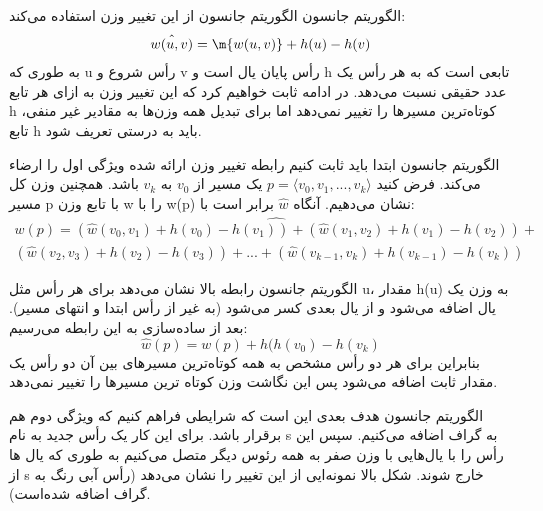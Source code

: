 \begin{itemframe}{الگوریتم جانسون}
\itm
الگوریتم جانسون از این تغییر وزن استفاده می‌کند:
\begin{align*}
\hat{w(u, v)} = \m{w(u, v)} + h(u) - h(v)
\end{align*}
\itm
به طوری که u رأس شروع و v رأس پایان یال است و h تابعی است که به هر رأس یک عدد حقیقی نسبت می‌دهد.
\itm
در ادامه ثابت خواهیم کرد که این تغییر وزن به ازای هر تابع h کوتاه‌ترین مسیرها را تغییر نمی‌دهد اما برای تبدیل همه وزن‌ها به مقادیر غیر منفی، تابع h باید به درستی تعریف شود.
\end{itemframe}

\begin{itemframe}{الگوریتم جانسون}
\itm
ابتدا باید ثابت ‌کنیم رابطه تغییر وزن ارائه شده ویژگی اول را ارضاء می‌کند.
\itm
فرض کنید
$ p= \langle v_0, v_1, ..., v_k \rangle$
یک مسیر از
$v_0$
به
$v_k$
باشد. همچنین وزن کل مسیر p با تابع وزن w را با  w(p) نشان می‌دهیم. آنگاه
$\hat{w}$
برابر است با:
\begin{align*}
\hat{w(p)= (\hat{w}(v_0, v_1) + h(v_0) -  h(v_1)) + (\hat{w}(v_1, v_2) + h(v_1) -  h(v_2)) + } \\
(\hat{w}(v_2, v_3) + h(v_2) -  h(v_3)) + ... + (\hat{w}(v_{k-1}, v_k) + h(v_{k-1}) -  h(v_k))
\end{align*}

\end{itemframe}

\begin{itemframe}{الگوریتم جانسون}
\itm
رابطه بالا نشان می‌دهد برای هر رأس مثل u، مقدار h(u) به وزن یک یال اضافه می‌شود و از یال بعدی کسر می‌شود (به غیر از رأس ابتدا و انتهای مسیر). بعد از ساده‌سازی به این رابطه می‌رسیم:
$$\hat{w}(p)=w(p) + h(h(v_0) - h(v_k)$$
\itm
بنابراین برای هر دو رأس مشخص به همه کوتاه‌ترین مسیرهای بین آن دو رأس یک مقدار ثابت اضافه می‌شود پس این نگاشت وزن کوتاه ترین مسیرها را تغییر نمی‌دهد.
\end{itemframe}
\begin{itemframe}{الگوریتم جانسون}
\itm
هدف بعدی این است که شرایطی فراهم کنیم که ویژگی دوم هم برقرار باشد. برای این کار یک رأس جدید به نام s به گراف اضافه می‌کنیم. سپس این رأس را با یال‌هایی با وزن صفر به همه رئوس دیگر متصل می‌کنیم به طوری که یال ‌ها از s خارج شوند.
شکل بالا نمونه‌ایی از این تغییر را نشان می‌دهد (رأس آبی رنگ به گراف اضافه شده‌است).
\end{itemframe}

